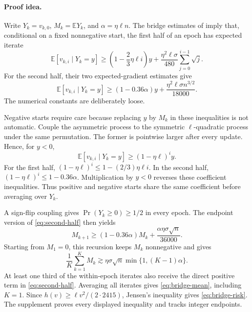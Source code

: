 \documentclass[twoside]{article}
\newcommand{\E}{\mathbb E}
\newcommand{\asympdown}{\mathrel{\gtrsim}}
\begin{document}
\paragraph{Proof idea.}
Write $Y_k=v_{k,0}$, $M_k=\E Y_k$, and
$\alpha=\eta\ell n$. The bridge estimates of
\citet{cha2023tighter} imply that, conditional on a fixed nonnegative start,
the first half of an epoch has expected iterate
\begin{equation}
 \E[v_{k,i}\mid Y_k=y]
 \ge \left(1-\frac23\eta\ell i\right)y
 +\frac{\eta^2\ell\sigma}{480}
 \sum_{j=0}^{i-1}\sqrt j.
 \label{eq:first-half}
\end{equation}
For the second half, their two expected-gradient estimates give
\begin{equation}
 \E[v_{k,i}\mid Y_k=y]
 \ge(1-0.36\alpha)y
 +\frac{\eta^2\ell\sigma n^{3/2}}{18000}.
 \label{eq:second-half}
\end{equation}
The numerical constants are deliberately loose.

Negative starts require care because replacing $y$ by $M_k$ in these
inequalities is not automatic. Couple the asymmetric process to the symmetric
$\ell$-quadratic process under the same permutation. The former is pointwise
larger after every update. Hence, for $y<0$,
\begin{equation}
 \E[v_{k,i}\mid Y_k=y]\ge(1-\eta\ell)^iy.
 \label{eq:negative}
\end{equation}
For the first half,
$(1-\eta\ell)^i\le1-(2/3)\eta\ell i$. In the second half,
$(1-\eta\ell)^i\le1-0.36\alpha$. Multiplication by $y<0$ reverses these
coefficient inequalities. Thus positive and negative starts share the same
coefficient before averaging over $Y_k$.

A sign-flip coupling gives $\Pr(Y_k\ge0)\ge1/2$ in every epoch. The endpoint
version of \eqref{eq:second-half} then yields
\begin{equation}
 M_{k+1}\ge(1-0.36\alpha)M_k
 +\frac{\alpha\eta\sigma\sqrt n}{36000}.
 \label{eq:epoch-recursion}
\end{equation}
Starting from $M_1=0$, this recursion keeps $M_k$ nonnegative and gives
\begin{equation}
 \frac1K\sum_{k=1}^KM_k
 \asympdown \eta\sigma\sqrt n\min\{1,(K-1)\alpha\}.
 \label{eq:mean-starts}
\end{equation}
At least one third of the within-epoch iterates also receive the direct positive
term in \eqref{eq:second-half}. Averaging all iterates gives
\eqref{eq:bridge-mean}, including $K=1$. Since
$h(v)\ge\ell v^2/(2\cdot2415)$, Jensen's inequality gives
\eqref{eq:bridge-risk}. The supplement proves every displayed inequality and
tracks integer endpoints.
\end{document}
